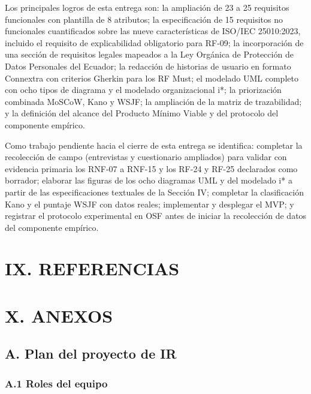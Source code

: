 Los principales logros de esta entrega son: la ampliación de 23 a 25 requisitos funcionales con plantilla de 8 atributos; la especificación de 15 requisitos no funcionales cuantificados sobre las nueve características de ISO/IEC 25010:2023, incluido el requisito de explicabilidad obligatorio para RF-09; la incorporación de una sección de requisitos legales mapeados a la Ley Orgánica de Protección de Datos Personales del Ecuador; la redacción de historias de usuario en formato Connextra con criterios Gherkin para los RF Must; el modelado UML completo con ocho tipos de diagrama y el modelado organizacional i*; la priorización combinada MoSCoW, Kano y WSJF; la ampliación de la matriz de trazabilidad; y la definición del alcance del Producto Mínimo Viable y del protocolo del componente empírico.


Como trabajo pendiente hacia el cierre de esta entrega se identifica: completar la recolección de campo (entrevistas y cuestionario ampliados) para validar con evidencia primaria los RNF-07 a RNF-15 y los RF-24 y RF-25 declarados como borrador; elaborar las figuras de los ocho diagramas UML y del modelado i* a partir de las especificaciones textuales de la Sección IV; completar la clasificación Kano y el puntaje WSJF con datos reales; implementar y desplegar el MVP; y registrar el protocolo experimental en OSF antes de iniciar la recolección de datos del componente empírico.


\section*{IX. REFERENCIAS}


\nocite{*}



\section*{X. ANEXOS}


\subsection*{A. Plan del proyecto de IR}


\subsubsection*{A.1 Roles del equipo}

